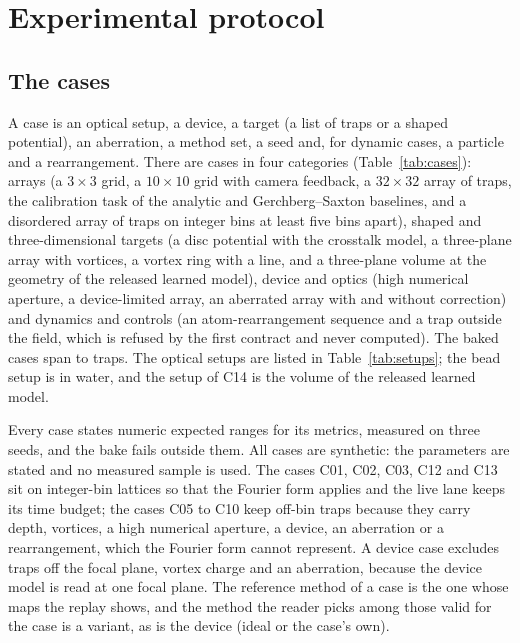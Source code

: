 
\section{Experimental protocol}\label{sec:protocol}

\subsection{The cases}\label{sec:cases}

A case is an optical setup, a device, a target (a list of traps or a shaped potential), an aberration, a method set, a seed and, for dynamic cases, a particle and a rearrangement. There are \nCases{} cases in four categories (Table~\ref{tab:cases}): arrays (a $3\times3$ grid, a $10\times10$ grid with camera feedback, a $32\times32$ array of \maxTraps{} traps, the calibration task of the analytic and Gerchberg--Saxton baselines, and a disordered array of \nDisordered{} traps on integer bins at least five bins apart), shaped and three-dimensional targets (a disc potential with the crosstalk model, a three-plane array with vortices, a vortex ring with a line, and a three-plane volume at the geometry of the released learned model), device and optics (high numerical aperture, a device-limited array, an aberrated array with and without correction) and dynamics and controls (an atom-rearrangement sequence and a trap outside the field, which is refused by the first contract and never computed). The baked cases span \minTraps{} to \maxTraps{} traps. The optical setups are listed in Table~\ref{tab:setups}; the bead setup is in water, and the setup of C14 is the volume of the released learned model.



Every case states numeric expected ranges for its metrics, measured on three seeds, and the bake fails outside them. All cases are synthetic: the parameters are stated and no measured sample is used. The cases C01, C02, C03, C12 and C13 sit on integer-bin lattices so that the Fourier form applies and the live lane keeps its time budget; the cases C05 to C10 keep off-bin traps because they carry depth, vortices, a high numerical aperture, a device, an aberration or a rearrangement, which the Fourier form cannot represent. A device case excludes traps off the focal plane, vortex charge and an aberration, because the device model is read at one focal plane. The reference method of a case is the one whose maps the replay shows, and the method the reader picks among those valid for the case is a variant, as is the device (ideal or the case's own).

